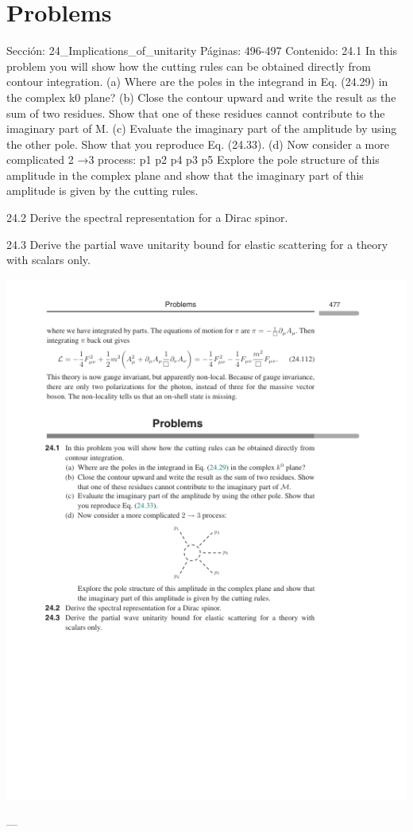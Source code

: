 \section*{Problems}
Sección: 24_Implications_of_unitarity
Páginas: 496-497
Contenido:
24.1 In this problem you will show how the cutting rules can be obtained directly from
contour integration.
(a) Where are the poles in the integrand in Eq. (24.29) in the complex k0 plane?
(b) Close the contour upward and write the result as the sum of two residues. Show
that one of these residues cannot contribute to the imaginary part of M.
(c) Evaluate the imaginary part of the amplitude by using the other pole. Show that
you reproduce Eq. (24.33).
(d) Now consider a more complicated 2 →3 process:
p1
p2
p4
p3
p5
Explore the pole structure of this amplitude in the complex plane and show that
the imaginary part of this amplitude is given by the cutting rules.

24.2 Derive the spectral representation for a Dirac spinor.

24.3 Derive the partial wave unitarity bound for elastic scattering for a theory with
scalars only.

\includegraphics{./figs/24_Implications_of_unitarity_page_497.png}

---

